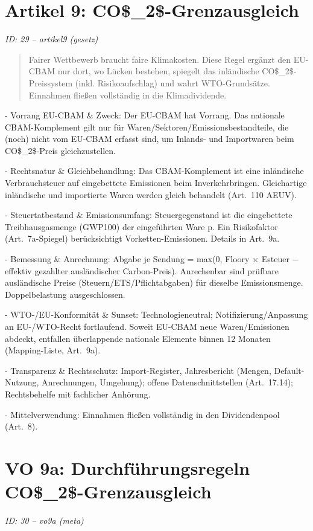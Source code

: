 \documentclass[12pt,a4paper]{scrartcl}
\begin{document}
\section[Artikel 9: CO\$\_2\$-Grenzausgleich]{Artikel 9: CO\$\_2\$-Grenzausgleich}
\noindent\textit{ID: 29 -- artikel9 (gesetz)}

\begin{quote}
Fairer Wettbewerb braucht faire Klimakosten. Diese Regel ergänzt den EU-CBAM nur dort, wo Lücken bestehen, spiegelt das inländische CO\$\_2\$-Preissystem (inkl. Risikoaufschlag) und wahrt WTO-Grundsätze. Einnahmen fließen vollständig in die Klimadividende.
\end{quote}

- Vorrang EU-CBAM \& Zweck: Der EU-CBAM hat Vorrang. Das nationale CBAM-Komplement gilt nur für Waren/Sektoren/Emissionsbestandteile, die (noch) nicht vom EU-CBAM erfasst sind, um Inlands- und Importwaren beim CO\$\_2\$-Preis gleichzustellen.

- Rechtsnatur \& Gleichbehandlung: Das CBAM-Komplement ist eine inländische Verbrauchsteuer auf eingebettete Emissionen beim Inverkehrbringen. Gleichartige inländische und importierte Waren werden gleich behandelt (Art. 110 AEUV).

- Steuertatbestand \& Emissionsumfang: Steuergegenstand ist die eingebettete Treibhausgasmenge (GWP100) der eingeführten Ware p. Ein Risikofaktor (Art. 7a-Spiegel) berücksichtigt Vorketten-Emissionen. Details in Art. 9a.

- Bemessung \& Anrechnung: Abgabe je Sendung = max(0, Floory × Esteuer − effektiv gezahlter ausländischer Carbon-Preis). Anrechenbar sind prüfbare ausländische Preise (Steuern/ETS/Pflichtabgaben) für dieselbe Emissionsmenge. Doppelbelastung ausgeschlossen.

- WTO-/EU-Konformität \& Sunset: Technologieneutral; Notifizierung/Anpassung an EU-/WTO-Recht fortlaufend. Soweit EU-CBAM neue Waren/Emissionen abdeckt, entfallen überlappende nationale Elemente binnen 12 Monaten (Mapping-Liste, Art. 9a).

- Transparenz \& Rechtsschutz: Import-Register, Jahresbericht (Mengen, Default-Nutzung, Anrechnungen, Umgehung); offene Datenschnittstellen (Art. 17.14); Rechtsbehelfe mit fachlicher Anhörung.

- Mittelverwendung: Einnahmen fließen vollständig in den Dividendenpool (Art. 8).


\section[VO 9a: Durchführungsregeln CO\$\_2\$-Grenzausgleich]{VO 9a: Durchführungsregeln CO\$\_2\$-Grenzausgleich}
\noindent\textit{ID: 30 -- vo9a (meta)}
\end{document}
